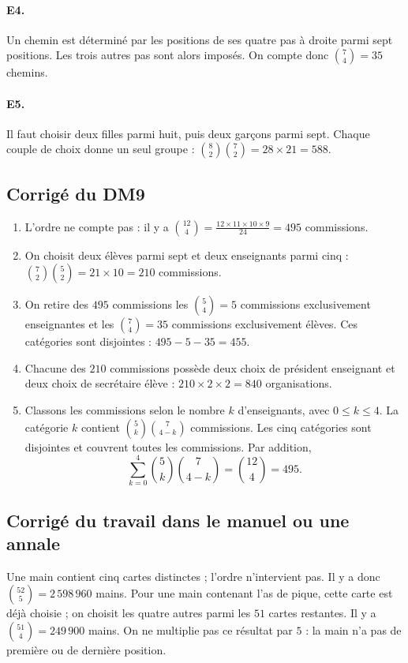 \paragraph{E4.}Un chemin est déterminé par les positions de ses quatre pas à droite parmi sept positions. Les trois autres pas sont alors imposés. On compte donc $\binom74=35$ chemins.

\paragraph{E5.}Il faut choisir deux filles parmi huit, puis deux garçons parmi sept. Chaque couple de choix donne un seul groupe : $\binom82\binom72=28\times21=588$.


\subsection{Corrigé du DM9}\begin{enumerate}
\item L'ordre ne compte pas : il y a $\binom{12}{4}=\frac{12\times11\times10\times9}{24}=495$ commissions.
\item On choisit deux élèves parmi sept et deux enseignants parmi cinq : $\binom72\binom52=21\times10=210$ commissions.
\item On retire des $495$ commissions les $\binom54=5$ commissions exclusivement enseignantes et les $\binom74=35$ commissions exclusivement élèves. Ces catégories sont disjointes : $495-5-35=455$.
\item Chacune des $210$ commissions possède deux choix de président enseignant et deux choix de secrétaire élève : $210\times2\times2=840$ organisations.
\item Classons les commissions selon le nombre $k$ d'enseignants, avec $0\le k\le4$. La catégorie $k$ contient $\binom5k\binom7{4-k}$ commissions. Les cinq catégories sont disjointes et couvrent toutes les commissions. Par addition,
\[\sum_{k=0}^4\binom5k\binom7{4-k}=\binom{12}4=495.\]
\end{enumerate}

\subsection{Corrigé du travail dans le manuel ou une annale}Une main contient cinq cartes distinctes ; l'ordre n'intervient pas. Il y a donc $\binom{52}5=2\,598\,960$ mains. Pour une main contenant l'as de pique, cette carte est déjà choisie ; on choisit les quatre autres parmi les $51$ cartes restantes. Il y a $\binom{51}4=249\,900$ mains. On ne multiplie pas ce résultat par $5$ : la main n'a pas de première ou de dernière position.

\fi

